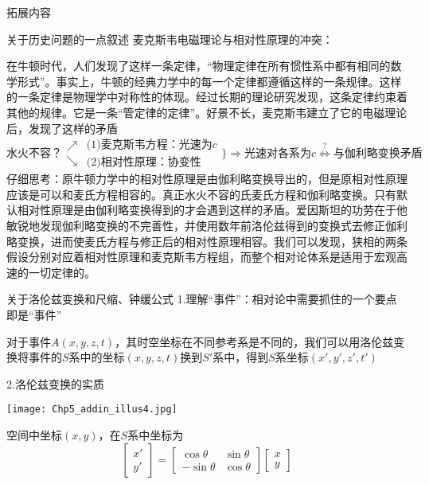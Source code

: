 \documentclass[a4paper, opensource]{./template/qyxf-book}
\begin{document}
\begin{section}{拓展内容}
\begin{subsection}{关于历史问题的一点叙述}
麦克斯韦电磁理论与相对性原理的冲突：

在牛顿时代，人们发现了这样一条定律，“物理定律在所有惯性系中都有相同的数学形式”。事实上，牛顿的经典力学中的每一个定律都遵循这样的一条规律。这样的一条定律是物理学中对称性的体现。经过长期的理论研究发现，这条定律约束着其他的规律。它是一条“管定律的定律”。好景不长，麦克斯韦建立了它的电磁理论后，发现了这样的矛盾
\begin{equation*}
\mbox{水火不容？}
\begin{array}{c}
\nearrow\\\searrow
\end{array}
\begin{array}{l}
\mbox{(1)麦克斯韦方程：光速为$c$}\\\mbox{(2)相对性原理：协变性}
\end{array}
\Bigg\}
\Rightarrow
\mbox{光速对各系为$c$}
\stackrel{?}{\iff}
\mbox{与伽利略变换矛盾}
\end{equation*}
仔细思考：原牛顿力学中的相对性原理是由伽利略变换导出的，但是原相对性原理应该是可以和麦氏方程相容的。真正水火不容的氏麦氏方程和伽利略变换。只有默认相对性原理是由伽利略变换得到的才会遇到这样的矛盾。爱因斯坦的功劳在于他敏锐地发现伽利略变换的不完善性，并使用数年前洛伦兹得到的变换式去修正伽利略变换，进而使麦氏方程与修正后的相对性原理相容。我们可以发现，狭相的两条假设分别对应着相对性原理和麦克斯韦方程组，而整个相对论体系是适用于宏观高速的一切定律的。
\end{subsection}

\begin{subsection}{关于洛伦兹变换和尺缩、钟缓公式}
1.理解“事件”：相对论中需要抓住的一个要点即是“事件”

对于事件$A(x,y,z,t)$，其时空坐标在不同参考系是不同的，我们可以用洛伦兹变换将事件的$S$系中的坐标$(x,y,z,t)$换到$S'$系中，得到$S$系坐标$(x',y',z',t')$

2.洛伦兹变换的实质
\begin{multicols}{2}
\hspace{4em}\texttt{[image: Chp5\_addin\_illus4.jpg]}

空间中坐标$(x,y)$，在$S$系中坐标为
\begin{equation*}
\begin{bmatrix}
x'\\y'
\end{bmatrix}
=
\begin{bmatrix}
\cos{\theta} & \sin{\theta}\\-\sin{\theta} & \cos{\theta}
\end{bmatrix}
\begin{bmatrix}
x\\y
\end{bmatrix}
\end{equation*}


\end{multicols}
\end{subsection}
\end{section}
\end{document}
